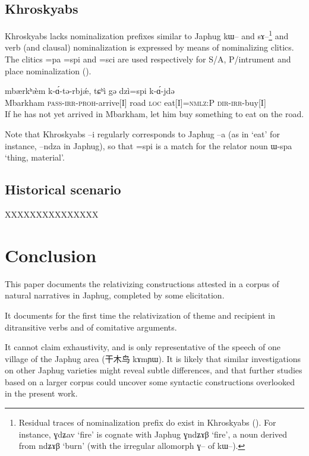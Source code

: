 \documentclass[oldfontcommands,oneside,a4paper,11pt]{article}
\newcommand{\ipa}[1]{{\phon #1}} %
\newcommand{\zh}[1]{{\cn #1}}
\begin{document}
\subsection{Khroskyabs}

Khroskyabs lacks nominalization prefixes similar to Japhug \ipa{kɯ--} and \ipa{sɤ--}\footnote{Residual traces of nominalization prefix do exist in Khroskyabs (\citealt{jacques12incorp}). For instance, \ipa{ɣdʑav} ‘fire’ is cognate with  Japhug \ipa{ɣndʑɤβ} ‘fire’, a  noun derived from \ipa{ndʑɤβ} `burn' (with the irregular allomorph \ipa{ɣ--} of \ipa{kɯ--}).} and verb (and clausal) nominalization is expressed by means of nominalizing clitics. The clitics \ipa{=pa} \ipa{=spi} and \ipa{=sci} are used respectively for S/A, P/intrument and place nominalization (\citealt[134]{lai13affixale}).


\begin{exe}
\ex
\gll
\ipa{mbærkʰæ̀m}  	\ipa{k-ɑ́-tə-rbjǽ,}  	\ipa{tɕʰì}  	\ipa{gə}  	\ipa{dzì}=\ipa{spi}  	\ipa{k-ɑ́-jdə}  \\
Mbarkham \textsc{pass-irr-proh}-arrive[I] road \textsc{loc} eat[I]=\textsc{nmlz:P} \textsc{dir-irr}-buy[I] \\
\glt If he has not yet arrived in Mbarkham, let him buy something to eat on the road.
\end{exe}

Note that Khroskyabs \ipa{--i} regularly corresponds to Japhug \ipa{--a} (as in `eat' for instance, \ipa{--ndza} in Japhug), so that \ipa{=spi} is a match for the relator noun \ipa{ɯ-spa} `thing, material'.

\subsection{Historical scenario}

XXXXXXXXXXXXXXX

\section{Conclusion}
This paper documents the relativizing constructions attested in a corpus of natural narratives in Japhug, completed by some elicitation.

It documents for the first time the relativization of theme and recipient in ditransitive verbs and of comitative arguments. 

 It cannot claim exhaustivity, and is only representative of the speech of one village of the Japhug area (\zh{干木鸟} \ipa{kɤmɲɯ}). It is likely that similar investigations on other Japhug varieties might reveal subtle differences, and that further studies based on a larger corpus could uncover some syntactic constructions overlooked in the present work.



\end{document}
